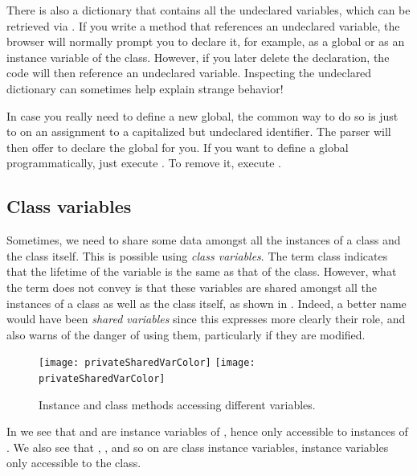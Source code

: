 \documentclass[a4paper,10pt,twoside]{book}
\begin{document}
There is also a dictionary that contains all the undeclared variables, which can be retrieved via .
If you write a method that references an undeclared variable, the browser will normally prompt you to declare it, for example, as a global or as an instance variable of the class.
However, if you later delete the declaration, the code will then reference an undeclared variable.
Inspecting the undeclared dictionary can sometimes help explain strange behavior!

In case you really need to define a new global, the common way to do so is just to  on an assignment to a capitalized but undeclared identifier.
The parser will then offer to declare the global for you.
If you want to define a global programmatically, just execute .
To remove it, execute .

\subsection{Class variables}
\label{sec:classVars}

Sometimes, we need to share some data amongst all the instances of a class and the class itself.
This is possible using \emph{class variables}.
The term class  indicates that the lifetime of the variable is the same as that of the class.
However, what the term does not convey is that these variables are shared amongst all the instances of a class as well as the class itself,
as shown in .
Indeed, a better name would have been \emph{shared variables} since this expresses more clearly their role, and also warns of the danger of using them, particularly if they are modified.

\begin{figure}[htb]
\begin{center}
\ifluluelse
	{\texttt{[image: privateSharedVarColor]}}
	{\texttt{[image: privateSharedVarColor]}}
\caption{Instance and class methods accessing different
variables.\label{fig:privateSharedVar}}
\end{center}
\end{figure}

In  we see that  and  are instance variables of , hence only accessible to instances of .
We also see that , ,  and so on are class instance variables, \ie instance variables only accessible to the  class.
\end{document}
